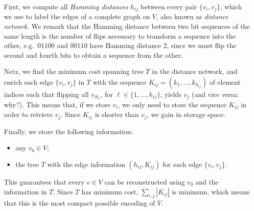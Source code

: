 \documentclass[a4paper]{book}
\theoremstyle{changebreak}                %
\begin{document}
First, we compute all {\it Hamming
  distances} $h_{ij}$ between
every pair $\{v_i,v_j\}$, which we use to label the edges
of a complete graph on $V$, also known as {\it
  distance network}. We remark that the
Hamming distance between two bit sequences of the same length is the
number of flips necessary to transform a sequence into the
other, e.g.~$01100$ and $00110$ have Hamming distance 2, since we must
flip the second and fourth bits to obtain a sequence from the other.

Netx, we find the minimum cost spanning tree $T$ in the distance
network, and enrich each edge $\{v_i,v_j\}$ in $T$ with the sequence
$K_{ij}=(k_1,\ldots,k_{h_{ij}})$ of element indices such that flipping
all $v_{ik_\ell}$, for $\ell\in\{1,\ldots,h_{ij}\}$, yields $v_j$ (and
vice versa: why?). This means that, if we store $v_i$, we only need to
store the sequence $K_{ij}$ in order to retrieve $v_j$. Since $K_{ij}$
is shorter than $v_j$, we gain in storage space.

Finally, we store the following information:
\begin{itemize}
\item any $v_0\in V$;
\item the tree $T$ with the edge information $(h_{ij},K_{ij})$ for
  each edge $\{v_i,v_j\}$.
\end{itemize}
This guarantees that every $v\in V$ can be reconstructed using $v_0$
and the information in $T$. Since $T$ has minimum cost, $\sum_{i,j}
|K_{ij}|$ is minimum, which means that this is the most compact
possible encoding of $V$.
\end{document}
